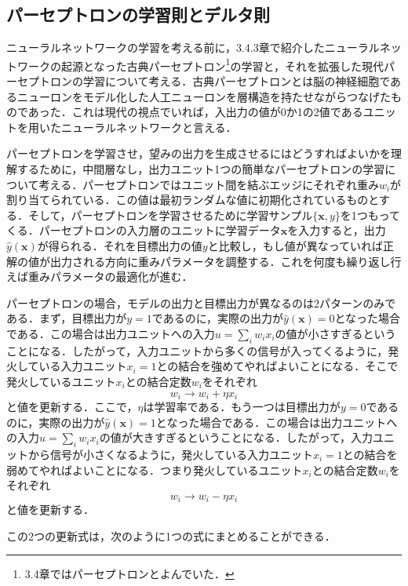 \documentclass[a4paper,11pt]{jsreport}
\begin{document}
\subsection{パーセプトロンの学習則とデルタ則}
ニューラルネットワークの学習を考える前に，3.4.3章で紹介したニューラルネットワークの起源となった古典パーセプトロン\footnote{3.4章ではパーセプトロンとよんでいた．}の学習と，それを拡張した現代パーセプトロンの学習について考える．古典パーセプトロンとは脳の神経細胞であるニューロンをモデル化した人工ニューロンを層構造を持たせながらつなげたものであった．これは現代の視点でいれば，入出力の値が0か1の2値であるユニットを用いたニューラルネットワークと言える．\par
パーセプトロンを学習させ，望みの出力を生成させるにはどうすればよいかを理解するために，中間層なし，出力ユニット1つの簡単なパーセプトロンの学習について考える．パーセプトロンではユニット間を結ぶエッジにそれぞれ重み$w_i$が割り当てられている．この値は最初ランダムな値に初期化されているものとする．そして，パーセプトロンを学習させるために学習サンプル$\{\bm{x}, y\}$を1つもってくる．パーセプトロンの入力層のユニットに学習データ$\bm{x}$を入力すると，出力$\hat{y}(\bm{x})$が得られる．それを目標出力の値$y$と比較し，もし値が異なっていれば正解の値が出力される方向に重みパラメータを調整する．これを何度も繰り返し行えば重みパラメータの最適化が進む．\par
パーセプトロンの場合，モデルの出力と目標出力が異なるのは2パターンのみである．まず，目標出力が$y=1$であるのに，実際の出力が$\hat{y}(\bm{x})=0$となった場合である．この場合は出力ユニットへの入力$u=\sum_{i}w_i x_i$の値が小さすぎるということになる．したがって，入力ユニットから多くの信号が入ってくるように，発火している入力ユニット$x_i=1$との結合を強めてやればよいことになる．そこで発火しているユニット$x_i$との結合定数$w_i$をそれぞれ
\begin{equation}
  w_i \rightarrow w_i + \eta x_i
\end{equation} 
と値を更新する．ここで，$\eta$は学習率である．もう一つは目標出力が$y=0$であるのに，実際の出力が$\hat{y}(\bm{x})=1$となった場合である．この場合は出力ユニットへの入力$u=\sum_{i}w_i x_i$の値が大きすぎるということになる．したがって，入力ユニットから信号が小さくなるように，発火している入力ユニット$x_i=1$との結合を弱めてやればよいことになる．つまり発火しているユニット$x_i$との結合定数$w_i$をそれぞれ
\begin{equation}
  w_i \rightarrow w_i - \eta x_i
\end{equation} 
と値を更新する．\par
この2つの更新式は，次のように1つの式にまとめることができる．
\end{document}
